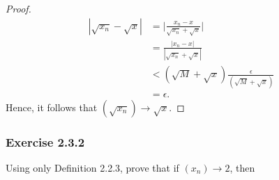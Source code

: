 \begin{enumerate}
\begin{proof}
        \begin{align*}
        |  \sqrt{x_n } - \sqrt{x}  | &= \Big| \frac{ x_n - x}{ \sqrt{x_n} + \sqrt{x}} \Big| \\
                          &= \frac{ | x_n - x |}{ |\sqrt{x_n} + \sqrt{x} | } \\
                          &< ( \sqrt{M} + \sqrt{x}) \frac{ \epsilon }{ (\sqrt{M} + \sqrt{x})} \\ 
                          &= \epsilon. 
        \end{align*}
        Hence, it follows that \( ( \sqrt{x_n}) \to \sqrt{x}\).
        \end{proof}
\end{enumerate}

\subsubsection{Exercise 2.3.2}
Using only Definition 2.2.3, prove that if \( (x_n) \to 2\), then 
